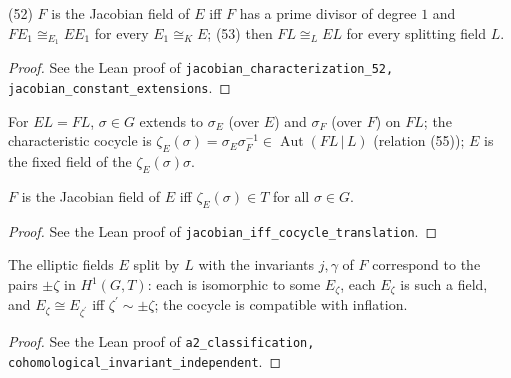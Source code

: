 \begin{theorem}
\label{thm:A2-52-53}
\leanok
(52) $F$ is the Jacobian field of $E$ iff $F$ has a prime divisor of degree $1$ and $FE_1\cong_{E_1}EE_1$ for every $E_1\cong_KE$; (53) then $FL\cong_LEL$ for every splitting field $L$.
\end{theorem}
\begin{proof}
See the Lean proof of \texttt{jacobian\_characterization\_52, jacobian\_constant\_extensions}.
\end{proof}

\begin{definition}
\label{def:char-cocycle}
\leanok
For $EL=FL$, $\sigma\in G$ extends to $\sigma_E$ (over $E$) and $\sigma_F$ (over $F$) on $FL$; the characteristic cocycle is $\zeta_E(\sigma)=\sigma_E\sigma_F^{-1}\in\operatorname{Aut}(FL\,|\,L)$ (relation (55)); $E$ is the fixed field of the $\zeta_E(\sigma)\sigma$.
\end{definition}

\begin{theorem}
\label{thm:A2-cocycle-translation}
\leanok
$F$ is the Jacobian field of $E$ iff $\zeta_E(\sigma)\in T$ for all $\sigma\in G$.
\end{theorem}
\begin{proof}
See the Lean proof of \texttt{jacobian\_iff\_cocycle\_translation}.
\end{proof}

\begin{proposition}[Classification by $H^1(G,T)$]
\label{prop:A2-classification}
\leanok
The elliptic fields $E$ split by $L$ with the invariants $j,\gamma$ of $F$ correspond to the pairs $\pm\zeta$ in $H^1(G,T)$: each is isomorphic to some $E_\zeta$, each $E_\zeta$ is such a field, and $E_\zeta\cong E_{\zeta^{\prime}}$ iff $\zeta^{\prime}\sim\pm\zeta$; the cocycle is compatible with inflation.
\end{proposition}
\begin{proof}
See the Lean proof of \texttt{a2\_classification, cohomological\_invariant\_independent}.
\end{proof}
